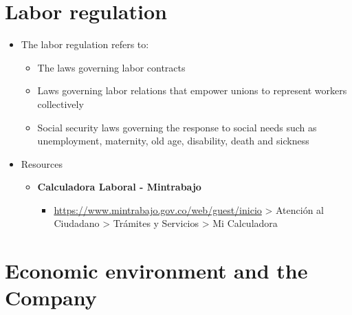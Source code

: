 \documentclass[
  ignorenonframetext,
]{beamer}
\providecommand{\tightlist}{%
  \setlength{\itemsep}{0pt}\setlength{\parskip}{0pt}}\usepackage{longtable,booktabs,array}
\begin{document}
\section{Labor regulation}\label{labor-regulation}

\begin{frame}{}
\label{section-14}
\begin{itemize}
\item
  The labor regulation refers to:

  \begin{itemize}
  \tightlist
  \item
    The laws governing labor contracts
  \item
    Laws governing labor relations that empower unions to represent
    workers collectively
  \item
    Social security laws governing the response to social needs such as
    unemployment, maternity, old age, disability, death and sickness
  \end{itemize}
\end{itemize}
\end{frame}

\begin{frame}{}
\label{section-15}
\begin{itemize}
\item
  Resources

  \begin{itemize}
  \item
    \textbf{Calculadora Laboral - Mintrabajo}

    \begin{itemize}
    \tightlist
    \item
      \url{https://www.mintrabajo.gov.co/web/guest/inicio}
      \textgreater{} Atención al Ciudadano \textgreater{} Trámites y
      Servicios \textgreater{} Mi Calculadora
    \end{itemize}
  \end{itemize}
\end{itemize}
\end{frame}

\section{Economic environment and the
Company}\label{economic-environment-and-the-company}
\end{document}
